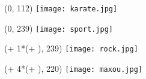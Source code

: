 \begin{textblock}{0}(0, 112)
	\texttt{[image: karate.jpg]}
\end{textblock}

\begin{textblock}{0}(0, 239)
	\texttt{[image: sport.jpg]}
\end{textblock}

\begin{textblock}{0}({\numexpr \fixMargin + 1*(\sizeMedia + \margin)}, 239)
	\texttt{[image: rock.jpg]}
\end{textblock}

\begin{textblock}{0}({\numexpr \fixMargin + 4*(\sizeMedia + \margin)}, 220)
	\texttt{[image: maxou.jpg]}
\end{textblock}